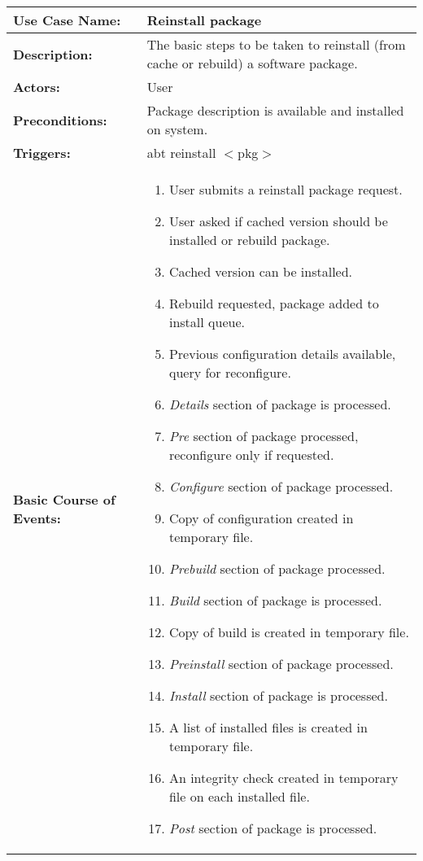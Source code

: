 \begin{tabularx}{\linewidth}{|l|X|}
\hline
\textbf{Use Case Name:} & \textbf{Reinstall package} \\
\hline
\textbf{Description:} & 
The basic steps to be taken to reinstall (from cache or rebuild) a software package.\\
\hline
\textbf{Actors:} & User \\
\hline
\textbf{Preconditions:} & Package description is available and installed on system. \\
\hline
\textbf{Triggers:} & abt reinstall $<$pkg$>$ \\
\hline
\textbf{Basic Course of Events:} & 
\begin{minipage}{\linewidth} 
  \vspace{0.02em}
  \begin{enumerate}
    \item User submits a reinstall package request.
    \item User asked if cached version should be installed or rebuild package.
    \item Cached version can be installed.
    \item Rebuild requested, package added to install queue.
    \item Previous configuration details available, query for reconfigure.
    \item \emph{Details} section of package is processed.
    \item \emph{Pre} section of package processed, reconfigure only if requested.
    \item \emph{Configure} section of package processed.
    \item Copy of configuration created in temporary file.
    \item \emph{Prebuild} section of package processed.
    \item \emph{Build} section of package is processed.
    \item Copy of build is created in temporary file.
    \item \emph{Preinstall} section of package processed.
    \item \emph{Install} section of package is processed.
    \item A list of installed files is created in temporary file.
    \item An integrity check created in temporary file on each installed file.
    \item \emph{Post} section of package is processed.

\end{enumerate}
\end{minipage}
\end{tabularx}
